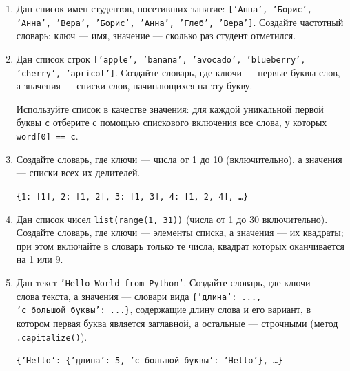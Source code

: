\documentclass[a4,12pt]{article}
\theoremstyle{remark}
\begin{document}
\begin{enumerate}
    \item Дан список имен студентов, посетивших занятие:
    \texttt{['Анна', 'Борис', 'Анна', 'Вера', 'Борис', 'Анна', 'Глеб', 'Вера']}.
    Создайте частотный словарь: ключ — имя, значение — сколько раз студент
    отметился.

    \item Дан список строк \texttt{['apple', 'banana', 'avocado', 'blueberry', 'cherry', 'apricot']}.
    Создайте словарь, где ключи — первые буквы слов,
    а значения — списки слов, начинающихся на эту букву.

    \begin{exercisehint}
        Используйте список в качестве значения: для каждой уникальной первой буквы
        \texttt{c} отберите с помощью спискового включения все слова,
        у которых \texttt{word[0] == c}.
    \end{exercisehint}

    \item Создайте словарь, где ключи — числа от 1 до 10 (включительно),
    а значения — списки всех их делителей.

    \begin{exerciseexample}
        \texttt{\{1: [1],\ 2: [1, 2],\ 3: [1, 3],\ 4: [1, 2, 4],\ \ldots\}}
    \end{exerciseexample}

    \item Дан список чисел \texttt{list(range(1, 31))} (числа от 1 до 30 включительно).
    Создайте словарь, где ключи — элементы списка, а значения — их квадраты;
    при этом включайте в словарь только те числа, квадрат которых оканчивается
    на 1 или 9.

    \item Дан текст \texttt{'Hello World from Python'}.
    Создайте словарь, где ключи — слова текста,
    а значения — словари вида \texttt{\{'длина': ..., 'с\_большой\_буквы': ...\}},
    содержащие длину слова и его вариант, в котором первая буква является
    заглавной, а остальные — строчными (метод \texttt{.capitalize()}).

    \begin{exerciseexample}
        \texttt{\{'Hello': \{'длина': 5, 'с\_большой\_буквы': 'Hello'\},\ \ldots\}}
    \end{exerciseexample}

\end{enumerate}
\end{document}
